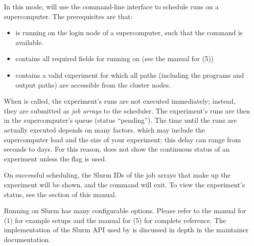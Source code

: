 \documentclass[a4paper,english]{article}
\begin{document}
\begin{adjustwidth}{18pt}{0pt}
\begin{Description}[Subcommands]
                        In this mode,  will use the  command-line
                        interface to schedule runs on a supercomputer.
                        The prerequisites are that:
                        \begin{itemize}
                            \item {} is running on the login node of a supercomputer, such
                                  that the  command is available.
                            \item {} contains all required fields for running on
                                   (see the manual for (5))
                            \item {} contains a valid experiment for which all
                                  paths (including the programs and output paths) are accessible
                                  from the cluster nodes.
                        \end{itemize}

                        When    is called, the experiment's runs
                        are not executed immediately; instead, they are submitted as \emph{job arrays}
                        to the  scheduler.
                        The experiment's runs are then in the supercomputer's queue (status ``pending'').
                        The time until the runs are actually executed depends on many factors, which
                        may include the supercomputer load and the size of your experiment; this
                        delay can range from seconds to days.
                        For this reason,    does not show the
                        continuous status of an experiment unless the  flag is
                        used.

                        On successful scheduling, the Slurm IDs of the job arrays that make
                        up the experiment will be shown, and the command will exit.
                        To view the experiment's status, see the   section
                        of this manual.

                        Running on Slurm has many configurable options.
                        Please refer to the manual for (1) for example setups
                        and the manual for (5) for complete reference.
                        The implementation of the Slurm API used by  is discussed
                        in depth in the  maintainer documentation.
                \end{Description}



\end{adjustwidth}
\end{document}
